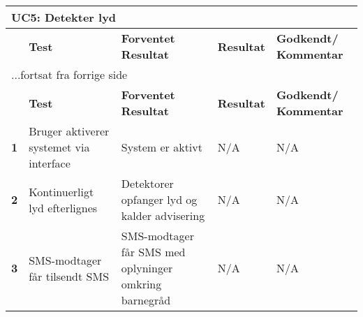 
\begin{center}
\begin{longtable}{|p{}|p{}|p{}|p{}|p{}|} %
\hline
\multicolumn{5}{|l|}{\textbf{UC5: Detekter lyd}} \\ \hline
\multicolumn{1}{|c|}{} &
\textbf{Test} &
\textbf{Forventet \newline Resultat} &
\textbf{Resultat} &
\textbf{Godkendt/ \newline Kommentar} \\ \hline 
\endfirsthead

\multicolumn{5}{l}{...fortsat fra forrige side} \\ \hline 
\multicolumn{1}{|c|}{} &
\textbf{Test} &
\textbf{Forventet \newline Resultat} &
\textbf{Resultat} &
\textbf{Godkendt/ \newline Kommentar} \\ \hline 
\endhead


\textbf{1}		
&Bruger aktiverer systemet via interface	
&System er aktivt 	
&N/A 	
&N/A \\\hline
\textbf{2}		
&Kontinuerligt lyd efterlignes	
&Detektorer opfanger lyd og kalder advisering 	
&N/A 	
&N/A \\\hline
\textbf{3}		
&SMS-modtager får tilsendt SMS	
&SMS-modtager får SMS med oplyninger omkring barnegråd 
&N/A 	
&N/A  \\\hline
	\end{longtable}
	\label{ATUC5} 
\end{center}

